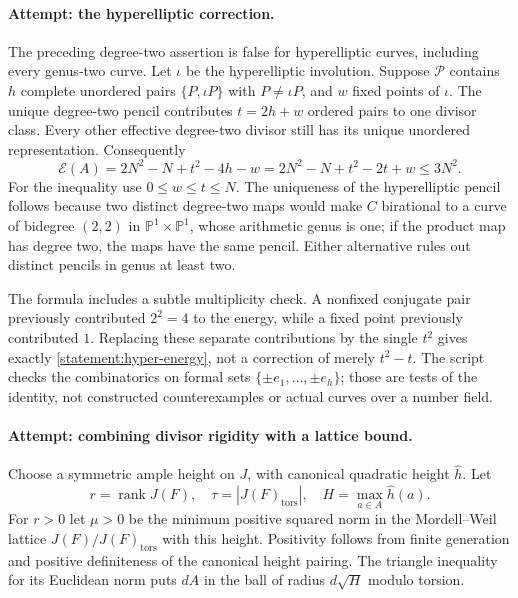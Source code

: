 \documentclass[11pt,a4paper]{article}
\newcommand{\PP}{\mathbb P}
\numberwithin{equation}{section}
\begin{document}
\paragraph{Attempt: the hyperelliptic correction.}
The preceding degree-two assertion is false for hyperelliptic curves,
including every genus-two curve. Let $\iota$ be the hyperelliptic
involution. Suppose $\mathcal P$ contains $h$ complete unordered pairs
$\{P,\iota P\}$ with $P\ne\iota P$, and $w$ fixed points of $\iota$.
The unique degree-two pencil contributes
$t=2h+w$ ordered pairs to one divisor class. Every other effective
degree-two divisor still has its unique unordered representation.
Consequently
\begin{equation}\label{statement:hyper-energy}
 \mathcal E(A)=2N^2-N+t^2-4h-w
             =2N^2-N+t^2-2t+w\le3N^2.
\end{equation}
For the inequality use $0\le w\le t\le N$. The uniqueness of the
hyperelliptic pencil follows because two distinct degree-two maps would
make $C$ birational to a curve of bidegree $(2,2)$ in
$\PP^1\times\PP^1$, whose arithmetic genus is one; if the product map
has degree two, the maps have the same pencil. Either alternative rules
out distinct pencils in genus at least two.

The formula includes a subtle multiplicity check. A nonfixed conjugate
pair previously contributed $2^2=4$ to the energy, while a fixed point
previously contributed $1$. Replacing these separate contributions by
the single $t^2$ gives exactly \eqref{statement:hyper-energy}, not a correction
of merely $t^2-t$. The script checks the combinatorics on formal sets
$\{\pm e_1,\ldots,\pm e_h\}$; those are tests of the identity, not
constructed counterexamples or actual curves over a number field.

\paragraph{Attempt: combining divisor rigidity with a lattice bound.}
Choose a symmetric ample height on $J$, with canonical quadratic height
$\widehat h$. Let
\[
 r=\operatorname{rank}J(F),\quad
 \tau=|J(F)_{\mathrm{tors}}|,\quad
 H=\max_{a\in A}\widehat h(a).
\]
For $r>0$ let $\mu>0$ be the minimum positive squared norm in the
Mordell--Weil lattice $J(F)/J(F)_{\mathrm{tors}}$ with this height.
Positivity follows from finite generation and positive definiteness of
the canonical height pairing. The triangle inequality for its Euclidean
norm puts $dA$ in the ball of radius $d\sqrt H$ modulo torsion.
\end{document}
